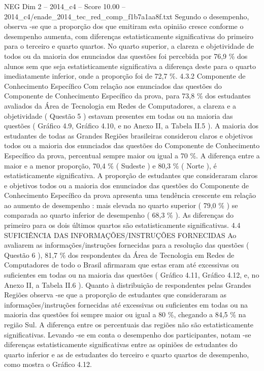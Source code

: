 \begin{textsample}{NEG Dim 2 – 2014\_c4 – Score 10.00 – 2014\_c4/enade\_2014\_tec\_red\_comp\_f1b7a1aa8f.txt}
Segundo o desempenho, observa -se que a proporção dos que emitiram esta opinião cresce conforme o desempenho aumenta, com diferenças estatisticamente significativas do primeiro para o terceiro e quarto quartos.
No quarto superior, a clareza e objetividade de todos ou da maioria dos enunciados das questões foi percebida por 76,9 \% dos alunos sem que seja estatisticamente significativa a diferença deste para o quarto imediatamente inferior, onde a proporção foi de 72,7 \%. 4.3.2 Componente de Conhecimento Específico Com relação aos enunciados das questões do Componente de Conhecimento Específico da prova, para 73,8 \% dos estudantes avaliados da Área de Tecnologia em Redes de Computadores, a clareza e a objetividade ( Questão 5 ) estavam presentes em todas ou na maioria das questões ( Gráfico 4.9, Gráfico 4.10, e no Anexo II, a Tabela II.5 ).
A maioria dos estudantes de todas as Grandes Regiões brasileiras considerou claros e objetivos todos ou a maioria dos enunciados das questões do Componente de Conhecimento Específico da prova, percentual sempre maior ou igual a 70 \%.
A diferença entre a maior e a menor proporção, 70,4 \% ( Sudeste ) e 80,3 \% ( Norte ), é estatisticamente significativa.
A proporção de estudantes que consideraram claros e objetivos todos ou a maioria dos enunciados das questões do Componente de Conhecimento Específico da prova apresenta uma tendência crescente em relação ao aumento de desempenho : mais elevada no quarto superior ( 79,0 \% ) se comparada ao quarto inferior de desempenho ( 68,3 \% ).
As diferenças do primeiro para os dois últimos quartos são estatisticamente significativas. 4.4 SUFICIÊNCIA DAS INFORMAÇÕES/INSTRUÇÕES FORNECIDAS Ao avaliarem as informações/instruções fornecidas para a resolução das questões ( Questão 6 ), 81,7 \% dos respondentes da Área de Tecnologia em Redes de Computadores de todo o Brasil afirmaram que estas eram até excessivas ou suficientes em todas ou na maioria das questões ( Gráfico 4.11, Gráfico 4.12, e, no Anexo II, a Tabela II.6 ).
Quanto à distribuição de respondentes pelas Grandes Regiões observa -se que a proporção de estudantes que consideraram as informações/instruções fornecidas até excessivas ou suficientes em todas ou na maioria das questões foi sempre maior ou igual a 80 \%, chegando a 84,5 \% na região Sul.
A diferença entre os percentuais das regiões não são estatisticamente significativas.
Levando -se em conta o desempenho dos participantes, notam -se diferenças estatisticamente significativas entre as opiniões de estudantes do quarto inferior e as de estudantes do terceiro e quarto quartos de desempenho, como mostra o Gráfico 4.12.

\end{textsample}
